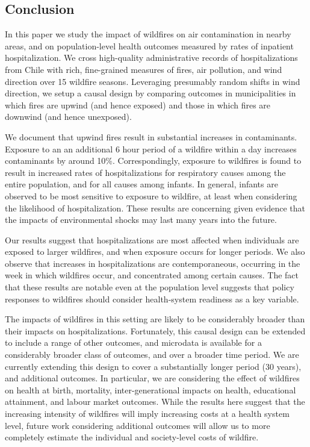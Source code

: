 \documentclass[11pt]{article}
\begin{document}
\begin{spacing}{1.5}
\section{Conclusion}
\label{scn:conclusion}
In this paper we study the impact of wildfires on air contamination in nearby areas, and on population-level health outcomes measured by rates of inpatient hospitalization.  We cross high-quality administrative records of hospitalizations from Chile with rich, fine-grained measures of fires, air pollution, and wind direction over 15 wildfire seasons.  Leveraging presumably random shifts in wind direction, we setup a causal design by comparing outcomes in municipalities in which fires are upwind (and hence exposed) and those in which fires are downwind (and hence unexposed).

We document that upwind fires result in substantial increases in contaminants.  Exposure to an an additional 6 hour period of a wildfire within a day increases contaminants by around 10\%.  Correspondingly, exposure to wildfires is found to result in increased rates of hospitalizations for respiratory causes among the entire population, and for all causes among infants.  In general, infants are observed to be most sensitive to exposure to wildfire, at least when considering the likelihood of hospitalization.  These results are concerning given evidence that the impacts of environmental shocks may last many years into the future.  

Our results suggest that hospitalizations are most affected when individuals are exposed to larger wildfires, and when exposure occurs for longer periods.  We also observe that increases in hospitalizations are contemporaneous, occurring in the week in which wildfires occur, and concentrated among certain causes.  The fact that these results are notable even at the population level suggests that policy responses to wildfires should consider health-system readiness as a key variable.

The impacts of wildfires in this setting are likely to be considerably broader than their impacts on hospitalizations.  Fortunately, this causal design can be extended to include a range of other outcomes, and microdata is available for a considerably broader class of outcomes, and over a broader time period.  We are currently extending this design to cover a substantially longer period (30 years), and additional outcomes.  In particular, we are considering the effect of wildfires on health at birth, mortality, inter-generational impacts on health, educational attainment, and labour market outcomes.  While the results here suggest that the increasing intensity of wildfires will imply increasing costs at a health system level, future work considering additional outcomes will allow us to more completely estimate the individual and society-level costs of wildfire.





\end{spacing}
\clearpage


\end{document}
